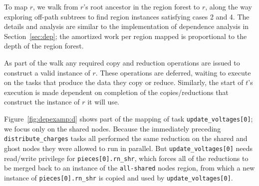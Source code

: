To map $r$, we walk from $r$'s
root ancestor in the region forest to $r$, along the way exploring
off-path subtrees to find region instances satisfying cases 2 and
4. The details and analysis are similar to the implementation of dependence
analysis in Section~\ref{sec:dep}; the amortized work per region mapped
is proportional to the depth of the region forest.

As part of the walk any required copy and reduction operations are
issued to construct a valid instance of $r$.  These operations are
deferred, waiting to execute on the tasks that produce the data they
copy or reduce. Similarly, the start of $t$'s execution is made
dependent on completion of the copies/reductions that construct the
instance of $r$ it will use.

Figure~\ref{fig:depexamp:d} shows part of the mapping of task {\tt update\_voltages[0]}; we focus
only on the shared nodes.
Because the immediately preceding {\tt distribute\_charges} tasks all performed the same reduction
on the shared and ghost nodes they were allowed to run in parallel.  But {\tt update\_voltages[0]}
needs read/write privilege for {\tt pieces[0].rn\_shr}, which forces all of the reductions to be merged
back to an instance of the {\tt all-shared} nodes region, from which a new instance of {\tt pieces[0].rn\_shr} is copied and used by {\tt update\_voltages[0]}.

%
%
%

